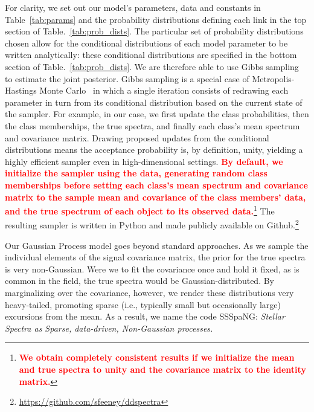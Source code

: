 \documentclass[a4paper,fleqn,usenatbib]{mnras}
\newcommand\edit[1]{\textcolor{red}{\textbf{#1}}}
\begin{document}
For clarity, we set out our model's parameters, data and constants in Table~\ref{tab:params} and the probability distributions defining each link in the top section of Table.~\ref{tab:prob_dists}. The particular set of probability distributions chosen allow for the conditional distributions of each model parameter to be written analytically: these conditional distributions are specified in the bottom section of Table.~\ref{tab:prob_dists}. We are therefore able to use Gibbs sampling~\citep{Geman_and_Geman:1984} to estimate the joint posterior. Gibbs sampling is a special case of Metropolis-Hastings Monte Carlo~\citep{Hastings:1970} in which a single iteration consists of redrawing each parameter in turn from its conditional distribution based on the current state of the sampler. For example, in our case, we first update the class probabilities, then the class memberships, the true spectra, and finally each class's mean spectrum and covariance matrix. Drawing proposed updates from the conditional distributions means the acceptance probability is, by definition, unity, yielding a highly efficient sampler even in  high-dimensional settings. \edit{By default, we initialize the sampler using the data, generating random class memberships before setting each class's mean spectrum and covariance matrix to the sample mean and covariance of the class members' data, and the true spectrum of each object to its observed data.}\footnote{\edit{We obtain completely consistent results if we initialize the mean and true spectra to unity and the covariance matrix to the identity matrix.}} The resulting sampler is written in Python and made publicly available on Github.\footnote{\href{https://github.com/sfeeney/ddspectra}{https://github.com/sfeeney/ddspectra}}

Our Gaussian Process model goes beyond standard approaches. As we sample the individual elements of the signal covariance matrix, the prior for the true spectra is very non-Gaussian. Were we to fit the covariance once and hold it fixed, as is common in the field, the true spectra would be Gaussian-distributed. By marginalizing over the covariance, however, we render these distributions very heavy-tailed, promoting sparse (i.e., typically small but occasionally large) excursions from the mean. As a result, we name the code SSSpaNG: {\em Stellar Spectra as Sparse, data-driven, Non-Gaussian processes.}
\end{document}
